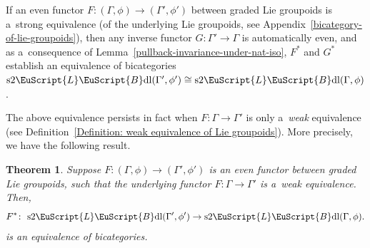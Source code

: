\documentclass[10pt,a4paper]{amsart}
\numberwithin{equation}{section}
\newtheorem{Theorem}{Theorem}[section]
\def\mathscr#1{\EuScript{#1}}
\newcommand{\LineBdl}{\mathscr{L}\mathscr{B}\mathrm{dl}}
\newcommand{\stwoLineBdl}{\mathrm{s}2\LineBdl}
\begin{document}
If an even functor $F\colon (\Gamma,\phi) \to (\Gamma',\phi')$ between graded Lie groupoids is a~strong equivalence (of the underlying Lie groupoids, see Appendix~\ref{bicategory-of-lie-groupoids}), then any inverse functor $G\colon \Gamma' \to \Gamma$ is automatically even, and as a~consequence of Lemma~\ref{pullback-invariance-under-nat-iso}, $F^{*}$ and $G^{*}$ establish an equivalence of bicategories
$
\stwoLineBdl(\Gamma',\phi') \cong \stwoLineBdl(\Gamma,\phi)$.

The above equivalence persists in fact when $F\colon \Gamma \to \Gamma'$ is only a~\emph{weak} equivalence (see Definition~\ref{Definition: weak equivalence of Lie groupoids}). More precisely, we have the following result.

\begin{Theorem}
\label{descent-for-graded-equivariant-2-line-bundles}
Suppose $F\colon (\Gamma,\phi) \to (\Gamma',\phi')$ is an even functor between graded Lie groupoids, such that the underlying functor $F\colon \Gamma \to \Gamma'$ is a~weak equivalence. Then,
\begin{equation*}
F^{*} \colon \ \stwoLineBdl(\Gamma',\phi') \to \stwoLineBdl(\Gamma,\phi).
\end{equation*}
is an equivalence of bicategories.
\end{Theorem}
\end{document}
